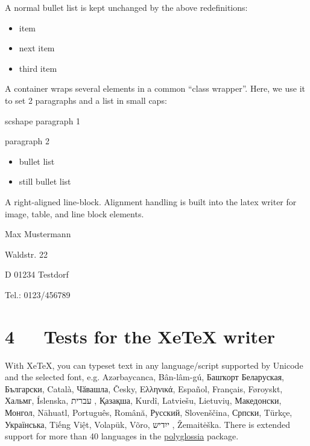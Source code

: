 \documentclass[a4paper]{article}
\begin{document}
A normal bullet list is kept unchanged by the above redefinitions:

\begin{itemize}
\item item

\item next item

\item third item
\end{itemize}

A container wraps several elements in a common “class wrapper”. Here, we use
it to set 2 paragraphs and a list in small caps:

\newcommand*{\DUCLASSscshape}{\scshape}

\begin{DUclass}{scshape}
paragraph 1

paragraph 2

\begin{itemize}
\item bullet list

\item still bullet list
\end{itemize}
\end{DUclass}

A right-aligned line-block. Alignment handling is built into the latex
writer for image, table, and line block elements.

\begin{DUlineblock}{0em}
\raggedleft
\item[] Max Mustermann
\item[] Waldstr. 22
\item[] D 01234 Testdorf
\item[] Tel.: 0123/456789
\end{DUlineblock}

% 


\section{4   Tests for the XeTeX writer%
  \label{tests-for-the-xetex-writer}%
}

With XeTeX, you can typeset text in any language/script supported by
Unicode and the selected font, e.g. Azərbaycanca, Bân-lâm-gú, Башҡорт
Беларуская, Български, Català, Чӑвашла, Česky, Ελληνικά, Español,
Français, Føroyskt, Хальмг, Íslenska, עברית , Қазақша, Kurdî,
Latviešu, Lietuvių, Македонски, Монгол, Nāhuatl, Português, Română,
Русский, Slovenščina, Српски, Türkçe, Українська, Tiếng Việt, Volapük,
Võro, ייִדיש , Žemaitėška.
There is extended support for more than 40 languages in the
\href{http://ctan.org/pkg/polyglossia}{polyglossia} package.
\end{document}
